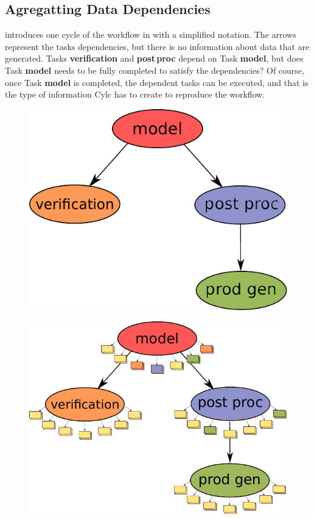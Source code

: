 \documentclass{superfri}
\begin{document}
\subsection{Agregatting Data Dependencies}

 introduces one cycle of the workflow in  with a simplified notation. The arrows represent the tasks dependencies, but there is no information about data that are generated. Tasks \textbf{verification} and \textbf{post\,proc} depend on Task \textbf{model}, but does Task \textbf{model} needs to be fully completed to satisfy the dependencies?
Of course, once Task \textbf{model} is completed, the dependent tasks can be executed, and that is the type of information Cylc has to create to reproduce the workflow.

\begin{figure}[b]
    \begin{minipage}{.45\linewidth}
        \centering
        \includegraphics[width=0.9\linewidth]{pic/cycle1}
        \label{fig:cycle1}
    \end{minipage}
    \begin{minipage}{.45\linewidth}
        \centering
        \includegraphics[width=0.9\linewidth]{pic/cycle-io-dep}

\end{minipage}
\end{figure}
\end{document}

